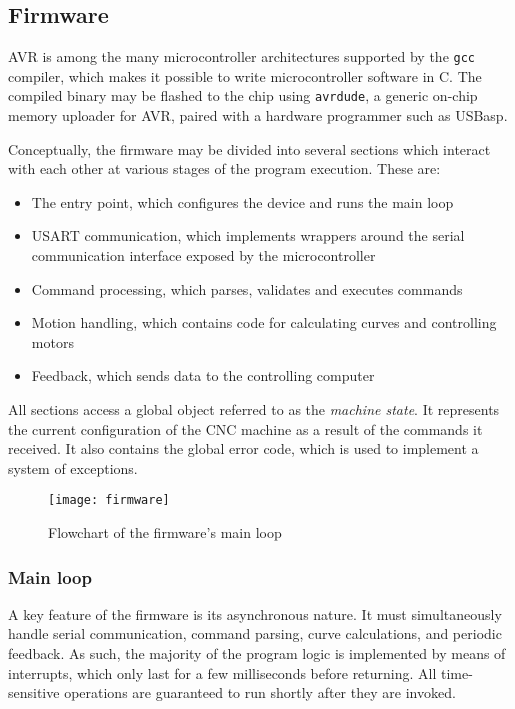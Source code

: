 \subsection{Firmware}

AVR is among the many microcontroller architectures supported by the \texttt{gcc} compiler,
which makes it possible to write microcontroller software in C. The compiled
binary may be flashed to the chip using \texttt{avrdude}, a generic
on-chip memory uploader for AVR, paired with a hardware programmer such as
USBasp.

Conceptually, the firmware may be divided into several sections which interact
with each other at various stages of the program execution. These are:
\begin{itemize}
    \item The entry point, which configures the device and runs the main loop
    \item USART communication, which implements wrappers around the serial
    communication interface exposed by the microcontroller
    \item Command processing, which parses, validates and executes commands
    \item Motion handling, which contains code for calculating curves and
    controlling motors
    \item Feedback, which sends data to the controlling computer
\end{itemize}
All sections access a global object referred to as the \textit{machine state}.
It represents the current configuration of the CNC machine as a result of the
commands it received. It also contains the global error code, which is used to
implement a system of exceptions.

\begin{figure}[ht]
    \begin{center}
        \texttt{[image: firmware]}
        \caption{Flowchart of the firmware's main loop}
    \end{center}
\end{figure}

\subsubsection{Main loop}

A key feature of the firmware is its asynchronous nature. It must simultaneously
handle serial communication, command parsing, curve calculations, and periodic
feedback. As such, the majority of the program logic is implemented by means of
interrupts, which only last for a few milliseconds before returning. All
time-sensitive operations are guaranteed to run shortly after they are invoked.

